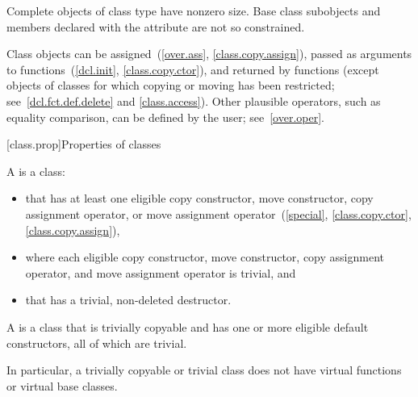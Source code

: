 \pnum
\begin{note}
Complete objects of class type have nonzero size.
Base class subobjects and
members declared with the  attribute
are not so constrained.
\end{note}

\pnum
\begin{note}
Class objects can be assigned~(\ref{over.ass}, \ref{class.copy.assign}),
passed as arguments to functions~(\ref{dcl.init}, \ref{class.copy.ctor}), and
returned by functions (except objects of classes for which copying or moving has
been restricted; see~\ref{dcl.fct.def.delete} and \ref{class.access}).
Other plausible operators, such as equality comparison,
can be defined by the user; see~\ref{over.oper}.
\end{note}

[class.prop]{Properties of classes}

\pnum
A  is a class:
\begin{itemize}
\item that has at least one eligible
copy constructor, move constructor,
copy assignment operator, or
move assignment operator~(\ref{special}, \ref{class.copy.ctor}, \ref{class.copy.assign}),
\item where each eligible copy constructor, move constructor, copy assignment operator,
and move assignment operator is trivial, and
\item that has a trivial, non-deleted destructor.
\end{itemize}

\pnum
A  is a class that is trivially copyable and
has one or more eligible default constructors,
all of which are trivial.
\begin{note}
In particular, a trivially copyable or trivial class does not have
virtual functions or virtual base classes.
\end{note}

